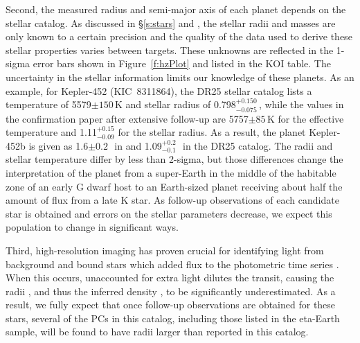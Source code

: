Second, the measured radius and semi-major axis of each planet depends on the stellar catalog.   As discussed in \S\ref{s:stars} and \citet{Mathur2017ApJS}, the stellar radii and masses are only known to a certain precision and the quality of the data used to derive these stellar properties varies between targets. These unknowns are reflected in the 1-sigma error bars shown in Figure~\ref{f:hzPlot} and listed in the KOI table. The uncertainty in the stellar information limits our knowledge of these planets.  As an example, for Kepler-452 (KIC~8311864), the DR25 stellar catalog lists a temperature of 5579$\pm150$\,K and stellar radius of 0.798$^{+0.150}_{-0.075}$\,\rsun, while the values in the confirmation paper \citep{Jenkins2015} after extensive follow-up are 5757$\pm85$\,K for the effective temperature and 1.11$^{+0.15}_{-0.09}$ for the stellar radius.  As a result, the planet Kepler-452b is given as 1.6$\pm0.2$\,\re\ in \citet{Jenkins2015} and 1.09$^{+0.2}_{-0.1}$\,\re\ in the DR25 catalog. The radii and stellar temperature differ by less than 2-sigma, but those differences change the interpretation of the planet from a super-Earth in the middle of the habitable zone of an early G dwarf host to an Earth-sized planet receiving about half the amount of flux from a late K star.  As follow-up observations of each candidate star is obtained and errors on the stellar parameters decrease, we expect this population to change in significant ways.  

Third, high-resolution imaging has proven crucial for identifying light from background and bound stars which added flux to the \Kepler{} photometric time series \citep{Furlan2017}. When this occurs, unaccounted for extra light dilutes the transit, causing the radii \citep{Ciardi2015}, and thus the inferred density \citep{Furlan2017densities}, to be significantly underestimated.  As a result, we fully expect that once follow-up observations are obtained for these stars, several of the PCs in this catalog, including those listed in the eta-Earth sample, will be found to have radii larger than reported in this catalog. 



